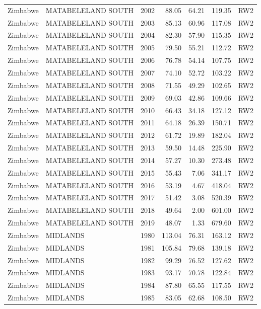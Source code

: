 \begin{longtable}{lllrrrl}
  Zimbabwe & MATABELELAND SOUTH & 2002 & 88.05 & 64.21 & 119.35 & RW2 \\ 
  Zimbabwe & MATABELELAND SOUTH & 2003 & 85.13 & 60.96 & 117.08 & RW2 \\ 
  Zimbabwe & MATABELELAND SOUTH & 2004 & 82.30 & 57.90 & 115.35 & RW2 \\ 
  Zimbabwe & MATABELELAND SOUTH & 2005 & 79.50 & 55.21 & 112.72 & RW2 \\ 
  Zimbabwe & MATABELELAND SOUTH & 2006 & 76.78 & 54.14 & 107.75 & RW2 \\ 
  Zimbabwe & MATABELELAND SOUTH & 2007 & 74.10 & 52.72 & 103.22 & RW2 \\ 
  Zimbabwe & MATABELELAND SOUTH & 2008 & 71.55 & 49.29 & 102.65 & RW2 \\ 
  Zimbabwe & MATABELELAND SOUTH & 2009 & 69.03 & 42.86 & 109.66 & RW2 \\ 
  Zimbabwe & MATABELELAND SOUTH & 2010 & 66.43 & 34.18 & 127.12 & RW2 \\ 
  Zimbabwe & MATABELELAND SOUTH & 2011 & 64.18 & 26.39 & 150.71 & RW2 \\ 
  Zimbabwe & MATABELELAND SOUTH & 2012 & 61.72 & 19.89 & 182.04 & RW2 \\ 
  Zimbabwe & MATABELELAND SOUTH & 2013 & 59.50 & 14.48 & 225.90 & RW2 \\ 
  Zimbabwe & MATABELELAND SOUTH & 2014 & 57.27 & 10.30 & 273.48 & RW2 \\ 
  Zimbabwe & MATABELELAND SOUTH & 2015 & 55.43 & 7.06 & 341.17 & RW2 \\ 
  Zimbabwe & MATABELELAND SOUTH & 2016 & 53.19 & 4.67 & 418.04 & RW2 \\ 
  Zimbabwe & MATABELELAND SOUTH & 2017 & 51.42 & 3.08 & 520.39 & RW2 \\ 
  Zimbabwe & MATABELELAND SOUTH & 2018 & 49.64 & 2.00 & 601.00 & RW2 \\ 
  Zimbabwe & MATABELELAND SOUTH & 2019 & 48.07 & 1.33 & 679.60 & RW2 \\ 
  Zimbabwe & MIDLANDS & 1980 & 113.04 & 76.31 & 163.12 & RW2 \\ 
  Zimbabwe & MIDLANDS & 1981 & 105.84 & 79.68 & 139.18 & RW2 \\ 
  Zimbabwe & MIDLANDS & 1982 & 99.29 & 76.52 & 127.62 & RW2 \\ 
  Zimbabwe & MIDLANDS & 1983 & 93.17 & 70.78 & 122.84 & RW2 \\ 
  Zimbabwe & MIDLANDS & 1984 & 87.80 & 65.55 & 117.55 & RW2 \\ 
  Zimbabwe & MIDLANDS & 1985 & 83.05 & 62.68 & 108.50 & RW2 \\ 

\end{longtable}
